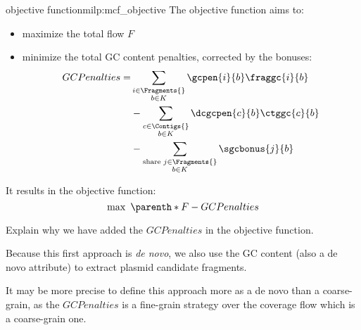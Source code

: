 \begin{definition}{\MCF{} objective function}{milp:mcf_objective}
    The objective function aims to:
    \begin{itemize}
        \item maximize the total flow \(F\)
        \item minimize the total GC content penalties, corrected by the bonuses:
        \begin{align}
            \begin{split}
                GCPenalties = & \sum_{\substack{
                    i \in \Fragments{} \\ 
                    b \in K
                }} \gcpen{i}{b} \fraggc{i}{b} \\
                & - \sum_{\substack{
                    c \in \Contigs{} \\ 
                    b \in K
                }} \dcgcpen{c}{b}\ctggc{c}{b} \\
                & - \sum_{\substack{
                    \text{share } j \in \Fragments{} \\
                    b \in K
                }} \sgcbonus{j}{b}
            \end{split}
        \end{align}
    \end{itemize}
    It results in the objective function:
    \begin{equation}
        \max ~ \parenth*{F - GCPenalties}
    \end{equation}
\end{definition}

\begin{todobox}
    Explain why we have added the \(GCPenalties\) in the \MCF{} objective function.
    
    Because this first approach is \emph{de novo}, we also use the GC content (also a de novo attribute) to extract plasmid candidate fragments.

    \begin{questionbox}
        It may be more precise to define this approach more as a de novo than a coarse-grain, as the \(GCPenalties\) is a fine-grain strategy over the coverage flow which is a coarse-grain one.
    \end{questionbox}
\end{todobox}
